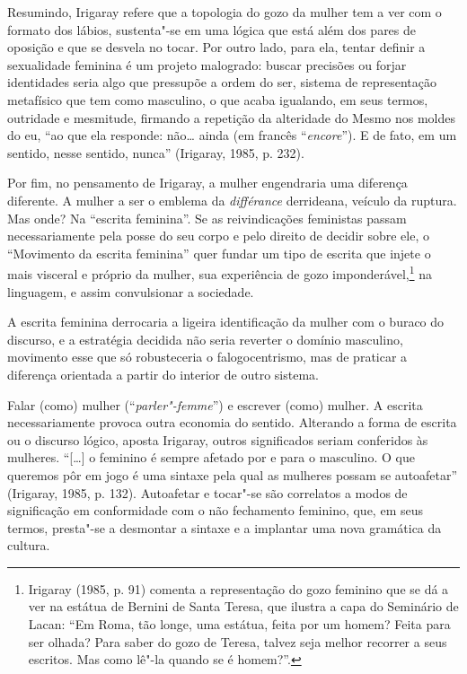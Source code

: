 Resumindo, Irigaray refere que a topologia do gozo da mulher tem a ver
com o formato dos lábios, sustenta"-se em uma lógica que está além dos
pares de oposição e que se desvela no tocar. Por outro lado, para ela,
tentar definir a sexualidade feminina é um projeto malogrado: buscar
precisões ou forjar identidades seria algo que pressupõe a ordem do ser,
sistema de representação metafísico que tem como masculino, o que acaba
igualando, em seus termos, outridade e mesmitude, firmando a repetição
da alteridade do Mesmo nos moldes do eu, ``ao que ela responde: não\ldots{}
ainda (em francês ``\emph{encore}''). E de fato, em um sentido, nesse
sentido, nunca'' (Irigaray, 1985, p. 232).

Por fim, no pensamento de Irigaray, a mulher engendraria uma diferença
diferente. A mulher a ser o emblema da \emph{différance} derrideana,
veículo da ruptura. Mas onde? Na ``escrita feminina''. Se as
reivindicações feministas passam necessariamente pela posse do seu corpo
e pelo direito de decidir sobre ele, o ``Movimento da escrita feminina''
quer fundar um tipo de escrita que injete o mais visceral e próprio da
mulher, sua experiência de gozo imponderável,\footnote{Irigaray
  (1985, p. 91) comenta a representação do gozo feminino que se dá
  a ver na estátua de Bernini de Santa Teresa, que ilustra a capa do
  Seminário  de Lacan: ``Em Roma, tão longe, uma estátua, feita por um
  homem? Feita para ser olhada? Para saber do gozo de Teresa, talvez
  seja melhor recorrer a seus escritos. Mas como lê"-la quando se é
  homem?''.} na linguagem, e assim convulsionar a sociedade.

A escrita feminina derrocaria a ligeira identificação da mulher com o
buraco do discurso, e a estratégia decidida não seria reverter o domínio
masculino, movimento esse que só robusteceria o falogocentrismo, mas de
praticar a diferença orientada a partir do interior de outro sistema.

Falar (como) mulher (``\emph{parler"-femme}'') e escrever (como) mulher.
A escrita necessariamente provoca outra economia do sentido. Alterando a
forma de escrita ou o discurso lógico, aposta Irigaray, outros
significados seriam conferidos às mulheres. ``{[}\ldots{}{]} o feminino é
sempre afetado por e para o masculino. O que queremos pôr em jogo é uma
sintaxe pela qual as mulheres possam se autoafetar'' (Irigaray,
1985, p. 132). Autoafetar e tocar"-se são correlatos a modos de
significação em conformidade com o não fechamento feminino, que, em seus
termos, presta"-se a desmontar a sintaxe e a implantar uma nova gramática
da cultura.


